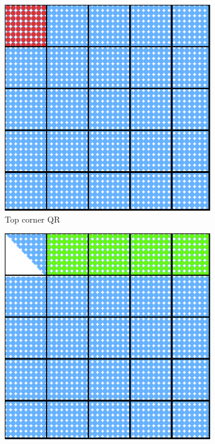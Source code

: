 \begin{figure}[h!]
  \begin{subfigure}{0.2 \textwidth}
    \includegraphics[width=\textwidth]{fig/SVD_tile_1_grid}
    \caption{\label{fig:tile_qr_1} Top corner QR}
  \end{subfigure}
  \hfill
  \begin{subfigure}{0.2 \textwidth}
    \includegraphics[width=\textwidth]{fig/SVD_tile_2_grid}

\end{subfigure}
\end{figure}
